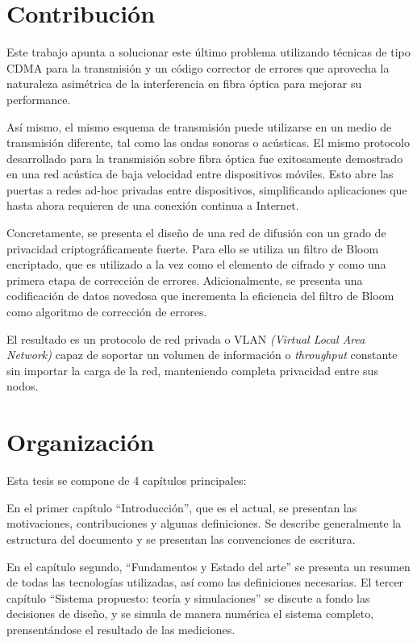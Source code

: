 \section{Contribución}

Este trabajo apunta a solucionar este último problema utilizando técnicas de tipo CDMA para la transmisión y un código corrector de errores que aprovecha la naturaleza asimétrica de la interferencia en fibra óptica para mejorar su performance.

Así mismo, el mismo esquema de transmisión puede utilizarse en un medio de transmisión diferente, tal como las ondas sonoras o acústicas. El mismo protocolo desarrollado para la transmisión sobre fibra óptica fue exitosamente demostrado en una red acústica de baja velocidad entre dispositivos móviles. Esto abre las puertas a redes ad-hoc privadas entre dispositivos, simplificando aplicaciones que hasta ahora requieren de una conexión continua a Internet.

Concretamente, se presenta el diseño de una red de difusión con un grado de privacidad criptográficamente fuerte. Para ello se utiliza un filtro de Bloom \cite{Bloom70space/timetrade-offs} encriptado, que es utilizado a la vez como el elemento de cifrado y como una primera etapa de corrección de errores. Adicionalmente, se presenta una codificación de datos novedosa\cite{6476559} que incrementa la eficiencia del filtro de Bloom como algoritmo de corrección de errores.

El resultado es un protocolo de red privada o VLAN \textit{(Virtual Local Area Network)} capaz de soportar un volumen de información o \textit{throughput} constante sin importar la carga de la red, manteniendo completa privacidad entre sus nodos.

\section{Organización}

Esta tesis se compone de 4 capítulos principales:

En el primer capítulo ``Introducción'', que es el actual, se presentan las motivaciones, contribuciones y algunas definiciones. Se describe generalmente la estructura del documento y se presentan las convenciones de escritura.

En el capítulo segundo, ``Fundamentos y Estado del arte'' se presenta un resumen de todas las tecnologías utilizadas, así como las definiciones necesarias.
El tercer capítulo ``Sistema propuesto: teoría y simulaciones'' se discute a fondo las decisiones de diseño, y se simula de manera numérica el sistema completo, prensentándose el resultado de las mediciones.

